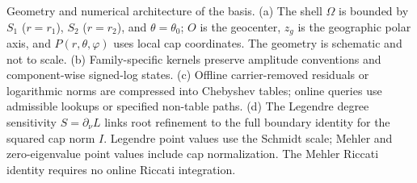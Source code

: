 Geometry and numerical architecture of the \RSCHA basis. (a) The shell $\Omega$ is bounded by $S_1$ ($r=r_1$), $S_2$ ($r=r_2$), and $\theta=\theta_0$; $O$ is the geocenter, $z_g$ is the geographic polar axis, and $P(r,\theta,\varphi)$ uses local cap coordinates. The geometry is schematic and not to scale. (b) Family-specific kernels preserve amplitude conventions and component-wise signed-log states. (c) Offline carrier-removed residuals or logarithmic norms are compressed into Chebyshev tables; online queries use admissible lookups or specified non-table paths. (d) The Legendre degree sensitivity $S=\partial_\nu L$ links root refinement to the full boundary identity for the squared cap norm $I$. Legendre point values use the Schmidt scale; Mehler and zero-eigenvalue point values include cap normalization. The Mehler Riccati identity requires no online Riccati integration.
